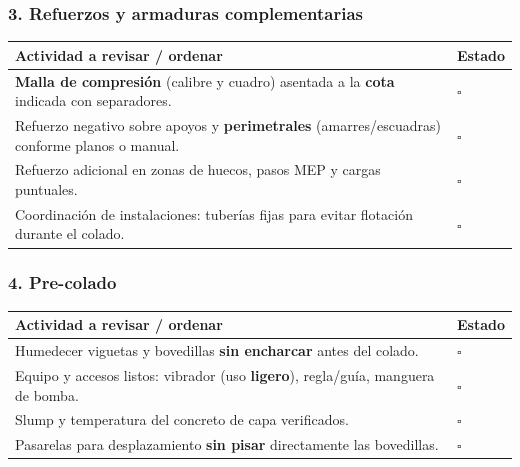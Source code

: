 \documentclass[12pt]{article}
\newcommand{\cbox}{\(\square\)}
\renewcommand{\cbox}{\(\square\)} %
\begin{document}
 \subsubsection*{3. Refuerzos y armaduras complementarias}
 \begin{tabularx}{\linewidth}{>{\raggedright\arraybackslash}p{0.93\linewidth} >{\centering\arraybackslash}m{0.07\linewidth}}
 	\toprule
 	\textbf{Actividad a revisar / ordenar} & \textbf{Estado}\\
 	\midrule
 	\textbf{Malla de compresión} (calibre y cuadro) asentada a la \textbf{cota} indicada con separadores. & \cbox \\
 	Refuerzo negativo sobre apoyos y \textbf{perimetrales} (amarres/escuadras) conforme planos o manual. & \cbox \\
 	Refuerzo adicional en zonas de huecos, pasos MEP y cargas puntuales. & \cbox \\
 	Coordinación de instalaciones: tuberías fijas para evitar flotación durante el colado. & \cbox \\
 	\bottomrule
 \end{tabularx}
 
 \subsubsection*{4. Pre-colado}
 \begin{tabularx}{\linewidth}{>{\raggedright\arraybackslash}p{0.93\linewidth} >{\centering\arraybackslash}m{0.07\linewidth}}
 	\toprule
 	\textbf{Actividad a revisar / ordenar} & \textbf{Estado}\\
 	\midrule
 	Humedecer viguetas y bovedillas \textbf{sin encharcar} antes del colado. & \cbox \\
 	Equipo y accesos listos: vibrador (uso \textbf{ligero}), regla/guía, manguera de bomba. & \cbox \\
 	Slump y temperatura del concreto de capa verificados. & \cbox \\
 	Pasarelas para desplazamiento \textbf{sin pisar} directamente las bovedillas. & \cbox \\
 	\bottomrule
 \end{tabularx}
 
\end{document}
